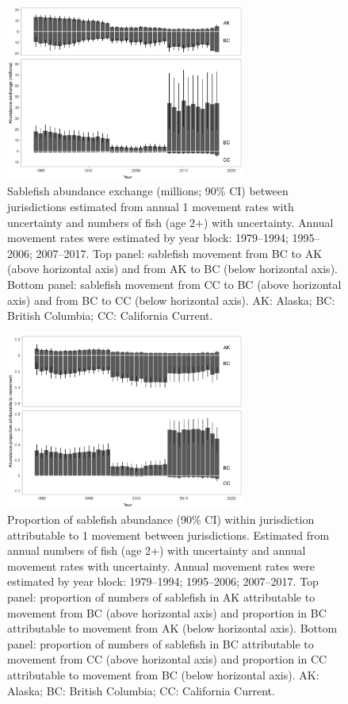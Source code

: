 \documentclass{article}
\begin{document}
\begin{figure}[htb]
    \centering
    \includegraphics[width = 0.7\textwidth]{bar-abundance-exchange}
    \caption{Sablefish abundance exchange (millions; 90\%{} CI) between jurisdictions estimated from annual 1\degree{} movement rates with uncertainty and numbers of fish (age 2+) with uncertainty. Annual movement rates were estimated by year block: 1979--1994; 1995--2006; 2007--2017. Top panel: sablefish movement from BC to AK (above horizontal axis) and from AK to BC (below horizontal axis). Bottom panel: sablefish movement from CC to BC (above horizontal axis) and from BC to CC (below horizontal axis). AK: Alaska; BC: British Columbia; CC: California Current.}
    \label{fig:bar-abundance-exchange}
\end{figure}

\begin{figure}[htb]
    \centering
    \includegraphics[width = 0.7\textwidth]{bar-percent-attributable}
    \caption{Proportion of sablefish abundance (90\%{} CI) within jurisdiction attributable to 1\degree{} movement between jurisdictions. Estimated from annual numbers of fish (age 2+) with uncertainty and annual movement rates with uncertainty. Annual movement rates were estimated by year block: 1979--1994; 1995--2006; 2007--2017. Top panel: proportion of numbers of sablefish in AK attributable to movement from BC (above horizontal axis) and proportion in BC attributable to movement from AK (below horizontal axis). Bottom panel: proportion of numbers of sablefish in BC attributable to movement from CC (above horizontal axis) and proportion in CC attributable to movement from BC (below horizontal axis). AK: Alaska; BC: British Columbia; CC: California Current.}
    \label{fig:bar-percent-attributable}
\end{figure}
\end{document}
